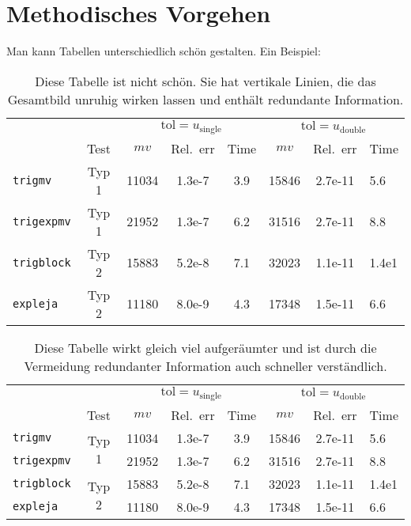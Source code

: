 \chapter{Methodisches Vorgehen}\label{ch:methodisches_vorgehen}
Man kann Tabellen unterschiedlich schön gestalten. Ein Beispiel:
\begin{table}[hbtp]
	\centering
	\caption[Unschöne Tabelle]{Diese Tabelle ist nicht schön. Sie hat vertikale Linien, die das Gesamtbild unruhig wirken lassen und enthält redundante Information.}
	\label{tab:unschoen}
	\begin{tabular}{|l|c|c|c|c|c|c|l|}\hline
		&& \multicolumn{3}{c|}{\(\text{tol}= u_{\text{single}}\)} & \multicolumn{3}{c|}{\(\text{tol}= u_{\text{double}}\)}\\
		&Test& $mv$  & Rel.~err & Time    & $mv$  & Rel.~err & Time   \\\hline
		\texttt{trigmv}   & Typ 1 & 11034 & 1.3e-7 & 3.9 & 15846 & 2.7e-11 & 5.6 \\
		\texttt{trigexpmv}& Typ 1  & 21952 & 1.3e-7 & 6.2 & 31516 & 2.7e-11 & 8.8 \\
		\texttt{trigblock}& Typ 2  & 15883 & 5.2e-8 & 7.1 & 32023 & 1.1e-11 & 1.4e1\\
		\texttt{expleja}  & Typ 2  & 11180 & 8.0e-9 & 4.3 & 17348 & 1.5e-11 & 6.6 \\\hline
	\end{tabular}
\end{table}


\begin{table}[hbtp]
	\centering
	\caption[Schöne Tabelle]{Diese Tabelle wirkt gleich viel aufgeräumter und ist durch die Vermeidung redundanter Information auch schneller verständlich.}
	\label{tab:schoen}
	\begin{tabular}{lccccccl}\hline
	&& \multicolumn{3}{c}{\(\text{tol}= u_{\text{single}}\)} & \multicolumn{3}{c}{\(\text{tol}= u_{\text{double}}\)} 
	\\\cmidrule(lr){3-5}\cmidrule(lr){6-8}
	&Test & $mv$  & Rel.~err & Time    & $mv$  & Rel.~err & Time\\\midrule
	\texttt{trigmv}   &\multirow{2}{*}{Typ 1} & 11034 & 1.3e-7 & 3.9 & 15846 & 2.7e-11 & 5.6 \\
	\texttt{trigexpmv}& & 21952 & 1.3e-7 & 6.2 & 31516 & 2.7e-11 & 8.8 \\
	\texttt{trigblock}&\multirow{2}{*}{Typ 2} & 15883 & 5.2e-8 & 7.1 & 32023 & 1.1e-11 & 1.4e1\\
	\texttt{expleja}  & & 11180 & 8.0e-9 & 4.3 & 17348 & 1.5e-11 & 6.6 \\\bottomrule
	\end{tabular}
\end{table}  

